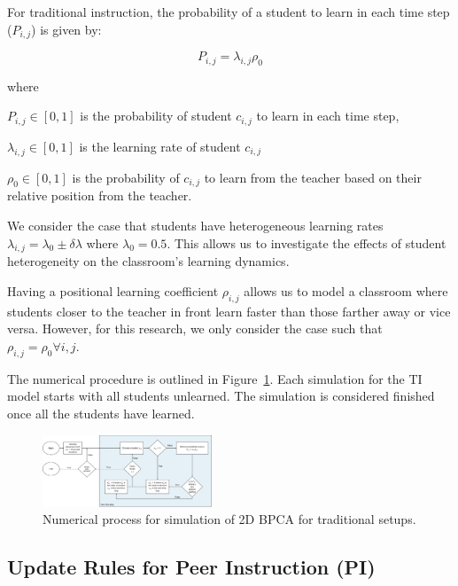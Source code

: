 \documentclass[twocolumn,secnumarabic,amssymb, nobibnotes, aps, prd]{revtex4-2}
\begin{document}
        For traditional instruction, the probability of a student to learn in each time step ($P_{i,j}$) is given by:

        \begin{equation}
            P_{i,j} = \lambda_{i,j}\rho_0
        \end{equation}

        where

        $P_{i,j} \in [0,1]$ is the probability of student $c_{i,j}$ to learn in each time step, 

        $\lambda_{i,j} \in [0,1]$ is the learning rate of student $c_{i,j}$

        $\rho_{0} \in [0,1]$ is the probability of $c_{i,j}$ to learn from the teacher based on their relative position from the teacher.

        We consider the case that students have heterogeneous learning rates $\lambda_{i,j}=\lambda_0 \pm \delta\lambda$ where $\lambda_0=0.5$.
        This allows us to investigate the effects of student heterogeneity on the classroom's learning dynamics.

        Having a positional learning coefficient $\rho_{i,j}$ allows us to model a classroom where students closer to the teacher in front learn faster than those farther away or vice versa.
        However, for this research, we only consider the case such that $\rho_{i,j} = \rho_0 \forall i,j$.

        The numerical procedure is outlined in Figure~\ref{fig:TI flowchart}.
        Each simulation for the TI model starts with all students unlearned.
        The simulation is considered finished once all the students have learned.

        \begin{figure}[htbp!]
            \centering
            \includegraphics[width=0.45\textwidth]{figures/2DBPCA TI Flowchart.png}
            \caption[Traditional instruction simulation flowchart]{Numerical process for simulation of 2D BPCA for traditional setups.}
            \label{fig:TI flowchart}
        \end{figure}

    \subsection{Update Rules for Peer Instruction (PI)}
\end{document}
